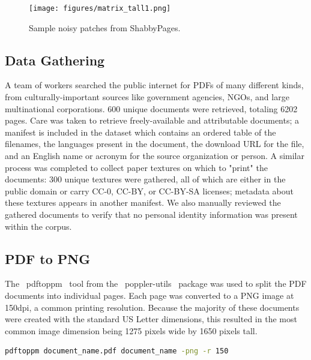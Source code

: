 \documentclass[runningheads]{llncs}
\begin{document}
\begin{figure}
    \texttt{[image: figures/matrix\_tall1.png]}
    \caption{Sample noisy patches from ShabbyPages.}
    \label{fig:matrix_tall1}
\end{figure}

\subsection{Data Gathering}
A team of workers searched the public internet for PDFs of many different kinds, from culturally-important sources like government agencies, NGOs, and large multinational corporations.
600 unique documents were retrieved, totaling 6202 pages.
Care was taken to retrieve freely-available and attributable documents; a manifest is included in the dataset which contains an ordered table of the filenames, the languages present in the document, the download URL for the file, and an English name or acronym for the source organization or person.
A similar process was completed to collect paper textures on which to "print" the documents: 300 unique textures were gathered, all of which are either in the public domain or carry CC-0, CC-BY, or CC-BY-SA licenses; metadata about these textures appears in another manifest.
We also manually reviewed the gathered documents to verify that no personal identity information was present within the corpus.

\subsection{PDF to PNG}
The ~pdftoppm~ tool from the ~poppler-utils~ package was used to split the PDF documents into individual pages.
Each page was converted to a PNG image at 150dpi, a common printing resolution.
Because the majority of these documents were created with the standard US Letter dimensions, this resulted in the most common image dimension being 1275 pixels wide by 1650 pixels tall.

\begin{lstlisting}[language=bash]
  pdftoppm document_name.pdf document_name -png -r 150
\end{lstlisting}
\end{document}
